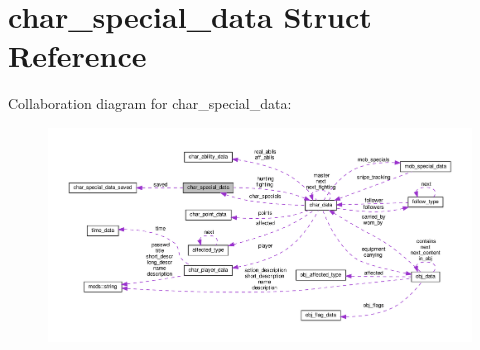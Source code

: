 \hypertarget{structchar__special__data}{}\section{char\+\_\+special\+\_\+data Struct Reference}
\label{structchar__special__data}


Collaboration diagram for char\+\_\+special\+\_\+data\+:
\nopagebreak
\begin{figure}[H]
\begin{center}
\leavevmode
\includegraphics[width=350pt]{structchar__special__data__coll__graph}
\end{center}
\end{figure}
